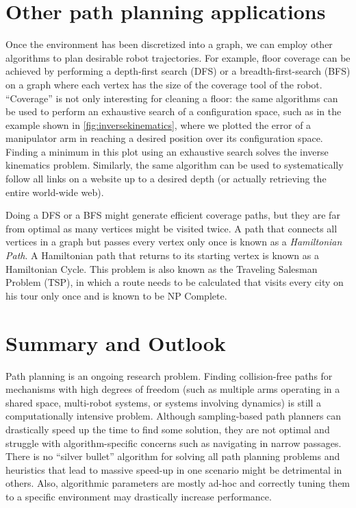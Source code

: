\section{Other path planning applications}

Once the environment has been discretized into a graph, we can employ other algorithms to plan desirable robot trajectories. For example, floor coverage can be achieved by performing a depth-first search (DFS) or a breadth-first-search (BFS) on a graph where each vertex has the size of the coverage tool of the robot. ``Coverage'' is not only interesting for cleaning a floor: the same algorithms can be used to perform an exhaustive search of a configuration space, such as in the example shown in \cref{fig:inversekinematics}, where we plotted the error of a manipulator arm in reaching a desired position over its configuration space. Finding a minimum in this plot using an exhaustive search solves the inverse kinematics problem. Similarly, the same algorithm can be used to systematically follow all links on a website up to a desired depth (or actually retrieving the entire world-wide web).

Doing a DFS or a BFS might generate efficient coverage paths, but they are far from optimal as many vertices might be visited twice. A path that connects all vertices in a graph but passes every vertex only once is known as a \textsl{Hamiltonian Path}. A Hamiltonian path that returns to its starting vertex is known as a Hamiltonian Cycle. This problem is also known as the Traveling Salesman Problem (TSP), in which a route needs to be calculated that visits every city on his tour only once and is known to be NP Complete.

\section{Summary and Outlook}

Path planning is an ongoing research problem. Finding collision-free paths for mechanisms with high degrees of freedom (such as multiple arms operating in a shared space, multi-robot systems, or systems involving dynamics) is still a computationally intensive problem.
Although sampling-based path planners can drastically speed up the time to find some solution, they are not optimal and struggle with algorithm-specific concerns such as navigating in narrow passages. There is no ``silver bullet'' algorithm for solving all path planning problems and heuristics that lead to massive speed-up in one scenario might be detrimental in others. Also, algorithmic parameters are mostly ad-hoc and correctly tuning them to a specific environment may drastically increase performance.

